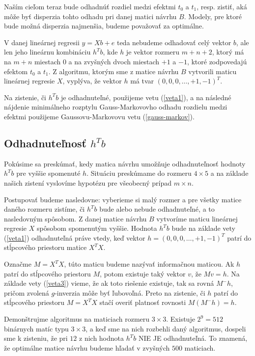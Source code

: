 Naším cieľom teraz bude odhadnúť rozdiel medzi efektmi $t_0$ a $t_1$, resp. zistiť, 
aká môže byť disperzia tohto odhadu pri danej matici návrhu $B$. 
Modely, pre ktoré bude možná disperzia najmenšia, budeme považovať za optimálne.

V danej lineárnej regresii $y = X b + e$ teda nebudeme odhadovať celý vektor $b$, 
ale len jeho lineárnu kombináciu $h^T b$, kde $h$ je vektor rozmeru $m + n + 2$, 
ktorý má na $m + n$ miestach $0$ a na zvyšných dvoch miestach $+1$ a $-1$, ktoré zodpovedajú efektom $t_0$ a $t_1$. 
Z algoritmu, ktorým sme z matice návrhu $B$ vytvorili maticu lineárnej regresie $X$, 
vyplýva, že vektor $h$ má tvar $(0, 0, 0, \ldots, +1, -1)^T$.

Na zistenie, či $h^T b$ je odhadnuteľné, použijeme vetu (\ref{veta1}), 
a na následné nájdenie minimálneho rozptylu Gauss-Markovovho odhadu rozdielu medzi efektmi 
použijeme Gaussovu-Markovovu vetu (\ref{gauss-markov}).

\subsection{Odhadnuteľnosť $h^T b$}

Pokúsime sa preskúmať, kedy matica návrhu umožňuje odhadnuteľnosť hodnoty $h^T b$ pre vyššie spomenuté $h$. 
Situáciu preskúmame do rozmeru $4 \times 5$ a na základe našich zistení vyslovíme hypotézu pre všeobecný prípad $m \times n$.

Postupovať budeme nasledovne: vyberieme si malý rozmer a pre všetky matice daného rozmeru zistíme, 
či $h^T b$ bude alebo nebude odhadnuteľné, a to nasledovným spôsobom. 
Z danej matice návrhu $B$ vytvoríme maticu lineárnej regresie $X$ spôsobom spomenutým vyššie. 
Hodnota $h^T b$ bude na základe vety (\ref{veta1}) odhadnuteľná práve vtedy, 
keď vektor $h = (0, 0, 0, \ldots, +1, -1)^T$ patrí do stĺpcového priestoru matice $X^T X$.

Označme $M = X^T X$, túto maticu budeme nazývať informačnou maticou. 
Ak $h$ patrí do stĺpcového priestoru $M$, potom existuje taký vektor $v$, že $M v = h$. 
Na základe vety (\ref{veta3}) vieme, že ak toto riešenie existuje, tak sa rovná $M^- h$, pričom zvolená $g$-inverzia môže byť ľubovoľná.
Preto na zistenie, či $h$ patrí do stĺpcového priestoru $M = X^T X$ stačí overiť platnosť rovnosti $M(M^- h) = h$. 

Demonštrujme algoritmus na maticiach rozmeru $3 \times 3$. Existuje $2^9 = 512$ binárnych matíc typu $3 \times 3$, 
a keď sme na nich rozbehli daný algoritmus, dospeli sme k zisteniu, že pri $12$ z nich hodnota $h^T b$ NIE JE odhadnuteľná.
To znamená, že optimálne matice návrhu budeme hľadať v zvyšných $500$ maticiach.

